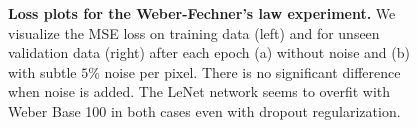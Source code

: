 \documentclass[journal]{vgtc}        %
\begin{document}
\begin{figure}[tbhp]
	\centering
	
	\hfill

  \caption{\textbf{Loss plots for the Weber-Fechner's law experiment.} We visualize the MSE loss on training data (left) and for unseen validation data (right) after each epoch (a) without noise and (b) with subtle $5\%$ noise per pixel. There is no significant difference when noise is added. The LeNet network seems to overfit with Weber Base 100 in both cases even with dropout regularization.}
	\label{fig:weber_loss}
\end{figure}
\end{document}

